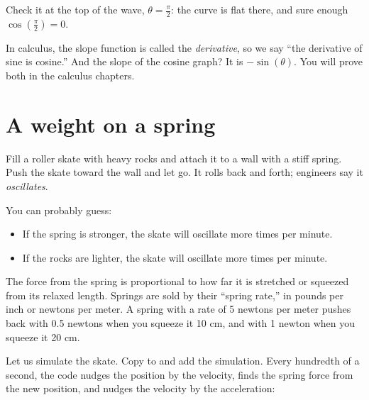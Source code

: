 Check it at the top of the wave, $\theta = \frac{\pi}{2}$: the curve is
flat there, and sure enough $\cos(\frac{\pi}{2}) = 0$.

In calculus, the slope function is called the \emph{derivative}, so we say
``the derivative of sine is
cosine.'' And the slope of the cosine graph? It is $-\sin(\theta)$. You
will prove both in the calculus chapters.

\section{A weight on a spring}

Fill a roller skate with heavy rocks and attach it to a wall with a stiff
spring. Push the skate toward the wall and let go. It rolls back and forth;
engineers say it \emph{oscillates}.

You can probably guess:
\begin{itemize}
\item If the spring is stronger, the skate will oscillate more times per minute.
\item If the rocks are lighter, the skate will oscillate more times per minute.
\end{itemize}

The force from the spring is proportional to how far it is stretched or
squeezed from its relaxed length. Springs are sold by their
``spring rate,'' in pounds per inch or newtons per
meter. A spring with a rate of 5 newtons per meter pushes back with 0.5
newtons when you squeeze it 10 cm, and with 1 newton when you squeeze it
20 cm.

Let us simulate the skate. Copy  to 
and add the simulation. Every hundredth of a second, the code nudges the
position by the velocity, finds the spring force from the new position,
and nudges the velocity by the acceleration:

